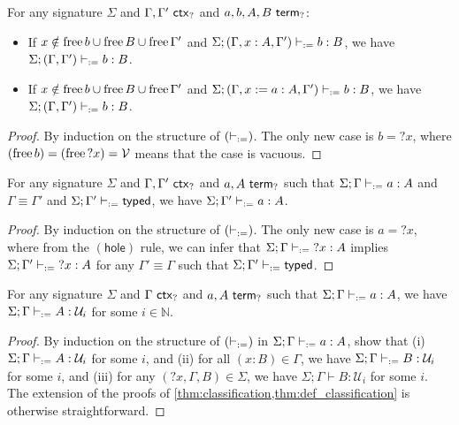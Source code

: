 \documentclass[twoside]{report}
\begin{document}
\begin{proposition}[Strengthening]
    \label{thm:hole_strengthening}
    For any signature $\Sigma$ and $\Gamma, \Gamma' \ \mathsf{ctx}_{?}$ and $a, b, A, B \ \mathsf{term}_{?}$:
    \begin{itemize}[noitemsep]
        \item If $x \notin \operatorname{free} b \cup \operatorname{free} B \cup \operatorname{free}{\Gamma'}$ and $\Sigma; (\Gamma, x : A, \Gamma') \vdash_{:=} b : B$, we have $\Sigma; (\Gamma, \Gamma') \vdash_{:=} b : B$.
        \item If $x \notin \operatorname{free} b \cup \operatorname{free} B \cup \operatorname{free}{\Gamma'}$ and $\Sigma; (\Gamma, x := a : A, \Gamma') \vdash_{:=} b : B$, we have $\Sigma; (\Gamma, \Gamma') \vdash_{:=} b : B$.
    \end{itemize}
\end{proposition}

\begin{proof}
    By induction on the structure of $(\vdash_{:=})$. The only new case is $b = {?x}$, where $(\operatorname{free} b) = (\operatorname{free} {?x}) = \mathcal V$ means that the case is vacuous.
\end{proof}

\begin{proposition}
    \label{thm:hole_context_conv}
    For any signature $\Sigma$ and $\Gamma, \Gamma' \ \mathsf{ctx}_{?}$ and $a, A \ \mathsf{term}_{?}$ such that $\Sigma; \Gamma \vdash_{:=} a : A$ and $\Gamma \equiv \Gamma'$ and $\Sigma; \Gamma' \vdash_{:=} \mathsf{typed}$, we have $\Sigma; \Gamma' \vdash_{:=} a : A$.
\end{proposition}

\begin{proof}
    By induction on the structure of $(\vdash_{:=})$. The only new case is $a = {?x}$, where from the $(\mathsf{hole})$ rule, we can infer that $\Sigma; \Gamma \vdash_{:=} {?x} : A$ implies $\Sigma; \Gamma' \vdash_{:=} {?x} : A$ for any $\Gamma' \equiv \Gamma$ such that $\Sigma; \Gamma' \vdash_{:=} \mathsf{typed}$.
\end{proof}

\begin{proposition}[Classification]
    \label{thm:hole_classification}
    For any signature $\Sigma$ and $\Gamma \ \mathsf{ctx}_{?}$ and $a, A \ \mathsf{term}_{?}$ such that $\Sigma; \Gamma \vdash_{:=} a : A$, we have $\Sigma; \Gamma \vdash_{:=} A : \mathcal U_i$ for some $i \in \mathbb N$.
\end{proposition}

\begin{proof}
    By induction on the structure of $(\vdash_{:=})$ in $\Sigma; \Gamma \vdash_{:=} a : A$, show that (i) $\Sigma; \Gamma \vdash_{:=} A : \mathcal U_i$ for some $i$, and (ii) for all $(x : B) \in \Gamma$, we have $\Sigma; \Gamma \vdash_{:=} B : \mathcal U_i$ for some $i$, and (iii) for any $({?x}, \Gamma, B) \in \Sigma$, we have $\Sigma; \Gamma \vdash B : \mathcal U_i$ for some $i$. The extension of the proofs of \cref{thm:classification,thm:def_classification} is otherwise straightforward.
\end{proof}
\end{document}
